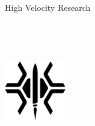 \begin{titlepage}
    \begin{center}
        \vspace*{1cm}
        
        \huge{\eco High Velocity Research}\\
        \huge{\eco \documentCategory}\\
        \vspace{0.8cm}
        \large{\eco \documentType}\\
        \vspace{0.8cm}
        \large{\eco \documentTitle}\\
        \textit{\eco \documentTitleShortHand}\\
        \vspace{3.5cm}
        \includegraphics[width=0.2\textwidth]{00-Formatting/logo_light.png}
    
        \vspace{2.5cm}
    
    \end{center}
\end{titlepage}

\tableofcontents
\pagebreak